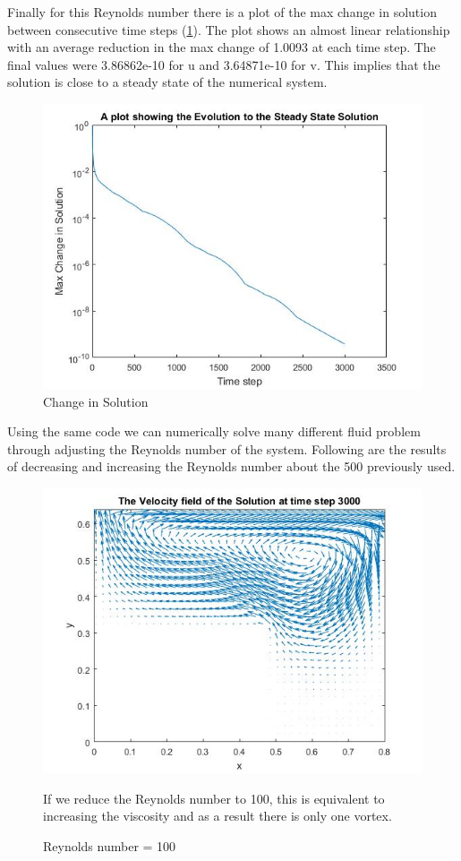 \documentclass[11pt,a4paper,notitlepage]{article}
\begin{document}
Finally for this Reynolds number there is a plot of the max change in solution between consecutive time steps (\ref{cav.res1}). The plot shows an almost linear relationship with an average reduction in the max change of 1.0093 at each time step. The final values were 3.86862e-10 for u and 3.64871e-10 for v. This implies that the solution is close to a steady state of the numerical system.

\newpage

\begin{figure}[h] 
\centering
\includegraphics[width=.7\linewidth]{CavityRes1.jpg}
\caption{Change in Solution}
\label{cav.res1}
\end{figure}

Using the same code we can numerically solve many different fluid problem through adjusting the Reynolds number of the system. Following are the results of decreasing and increasing the Reynolds number about the 500 previously used.

\begin{figure}[h]
\begin{minipage}{0.6\textwidth}
\includegraphics[width=1.1\linewidth]{Cavity100Vel1.jpg}
\end{minipage}
\begin{minipage}{0.3\textwidth}
If we reduce the Reynolds number to 100, this is equivalent to increasing the viscosity and as a result there is only one vortex.
\end{minipage}
\caption{Reynolds number = 100}
\label{cav.100vel1}
\end{figure}
\end{document}
